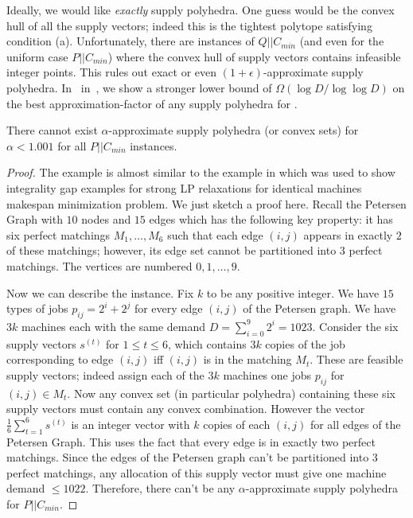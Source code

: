 Ideally, we would like {\em exactly} supply polyhedra. One guess would be the convex hull of all the supply vectors; indeed this is the tightest polytope satisfying condition (a).
Unfortunately, there are instances of $Q||C_{min}$ (and even for the uniform case $P||C_{min}$) where the convex hull of supply vectors contains infeasible integer points.
This rules out exact or even $(1+\epsilon)$-approximate supply polyhedra. In~ in~, we show a stronger lower bound of $\Omega(\log D/\log \log D)$ on the best approximation-factor of any supply polyhedra for \cckp.
\begin{theorem}\label{fthm:no-supp}
	There cannot exist $\alpha$-approximate supply polyhedra (or convex sets) for $\alpha < 1.001$ for all  $P||C_{min}$ instances.
\end{theorem}
\begin{proof}
The example is almost similar to the example in \cite{KurpiszMMMVW16} which was used to show integrality gap examples for strong LP relaxations for identical machines makespan minimization problem.
We just sketch a proof here. Recall the Petersen Graph with $10$ nodes and $15$ edges which has the following key property: it has six perfect matchings $M_1,\ldots,M_6$ such that each edge $(i,j)$ appears in exactly $2$ of these matchings; however, its edge set cannot be partitioned into $3$ perfect matchings.
The vertices are numbered $0,1,\ldots,9$.

Now we can describe the instance. Fix $k$ to be any positive integer.
We have $15$ types of jobs $p_{ij} = 2^i + 2^j$ for every edge $(i,j)$ of the Petersen graph.
We have $3k$ machines each with the same demand $D = \sum_{i=0}^9 2^i = 1023$.
Consider the six supply vectors $s^{(t)}$ for $1\leq t\leq 6$,  which contains $3k$ copies of the job corresponding to edge $(i,j)$ iff $(i,j)$ is in the matching $M_t$.
These are feasible supply vectors; indeed assign each of the $3k$ machines one jobs $p_{ij}$ for $(i,j) \in M_t$. Now any convex set (in particular polyhedra) containing these six supply vectors
must contain any convex combination. However the vector $\frac{1}{6}\sum_{t=1}^6 s^{(t)}$ is an integer vector with $k$ copies of each $(i,j)$ for all edges of the Petersen Graph.
This uses the fact that every edge is in exactly two perfect matchings. Since the edges of the  Petersen graph can't be partitioned into $3$ perfect matchings, any allocation of this supply vector
must give one machine demand $\leq 1022$. Therefore, there can't be any $\alpha$-approximate supply polyhedra for $P||C_{min}$.
\end{proof}

